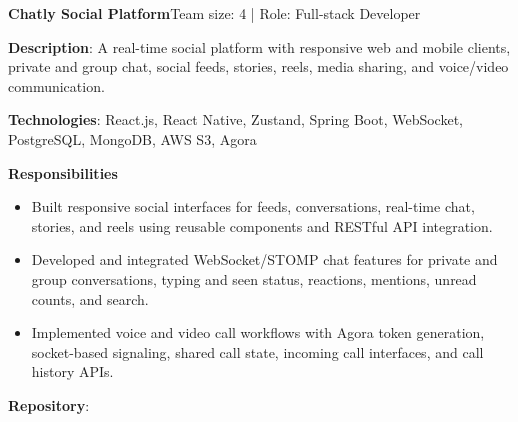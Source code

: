   \resumeProjectHeading
    {\textbf{Chatly Social Platform}}{Team size: 4 | Role: Full-stack Developer}
    \resumeItemListStart
      \item \textbf{Description}: A real-time social platform with responsive web and mobile clients, private and group chat, social feeds, stories, reels, media sharing, and voice/video communication.
      \item \textbf{Technologies}: React.js, React Native, Zustand, Spring Boot, WebSocket, PostgreSQL, MongoDB, AWS S3, Agora
      \item \textbf{Responsibilities}
        \begin{itemize}
          \item Built responsive social interfaces for feeds, conversations, real-time chat, stories, and reels using reusable components and RESTful API integration.
          \item Developed and integrated WebSocket/STOMP chat features for private and group conversations, typing and seen status, reactions, mentions, unread counts, and search.
          \item Implemented voice and video call workflows with Agora token generation, socket-based signaling, shared call state, incoming call interfaces, and call history APIs.
        \end{itemize}
      \item \textbf{Repository}: \href{https://github.com/nvminh162/chatly-social-platform}{}
    \resumeItemListEnd

